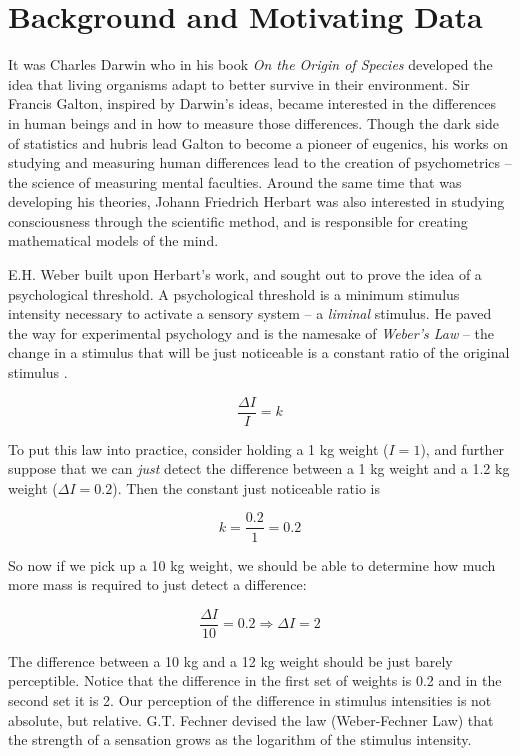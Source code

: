 \documentclass[
]{report}
\begin{document}
\hypertarget{motivating-data}{%
\chapter{Background and Motivating Data}\label{motivating-data}}

It was Charles Darwin who in his book \emph{On the Origin of Species} developed the idea that living organisms adapt to better survive in their environment. Sir Francis Galton, inspired by Darwin's ideas, became interested in the differences in human beings and in how to measure those differences. Though the dark side of statistics and hubris lead Galton to become a pioneer of eugenics, his works on studying and measuring human differences lead to the creation of psychometrics -- the science of measuring mental faculties. Around the same time that was developing his theories, Johann Friedrich Herbart was also interested in studying consciousness through the scientific method, and is responsible for creating mathematical models of the mind.

E.H. Weber built upon Herbart's work, and sought out to prove the idea of a psychological threshold. A psychological threshold is a minimum stimulus intensity necessary to activate a sensory system -- a \emph{liminal} stimulus. He paved the way for experimental psychology and is the namesake of \emph{Weber's Law} -- the change in a stimulus that will be just noticeable is a constant ratio of the original stimulus \citep{britannica2014editors}.

\[
\frac{\Delta I}{I} = k
\]

To put this law into practice, consider holding a 1 kg weight (\(I = 1\)), and further suppose that we can \emph{just} detect the difference between a 1 kg weight and a 1.2 kg weight (\(\Delta I = 0.2\)). Then the constant just noticeable ratio is

\[
k = \frac{0.2}{1} = 0.2
\]

So now if we pick up a 10 kg weight, we should be able to determine how much more mass is required to just detect a difference:

\[
\frac{\Delta I}{10} = 0.2 \Rightarrow \Delta I = 2
\]

The difference between a 10 kg and a 12 kg weight should be just barely perceptible. Notice that the difference in the first set of weights is 0.2 and in the second set it is 2. Our perception of the difference in stimulus intensities is not absolute, but relative. G.T. Fechner devised the law (Weber-Fechner Law) that the strength of a sensation grows as the logarithm of the stimulus intensity.
\end{document}
